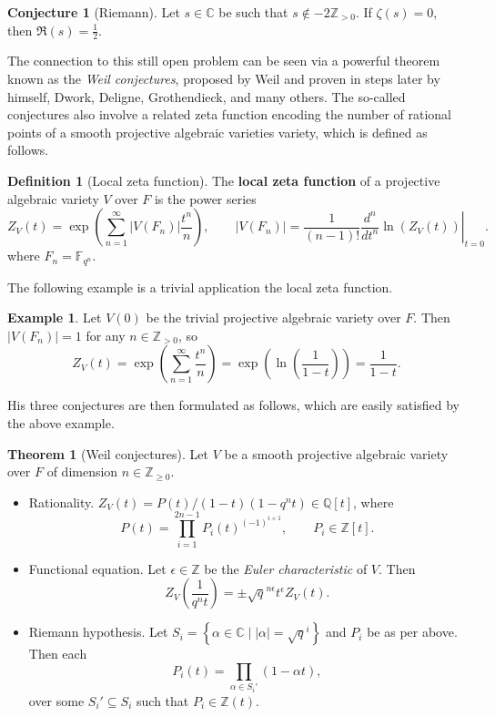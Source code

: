 \documentclass{article}
\newcommand{\F}{\mathbb{F}}
\newcommand{\Z}{\mathbb{Z}}
\newcommand{\Q}{\mathbb{Q}}
\newcommand{\C}{\mathbb{C}}
\newcommand{\val}[1]{\left. #1 \right\rvert}
\newcommand{\rb}[1]{\left( #1 \right)}
\renewcommand{\sb}[1]{\left[ #1 \right]}
\newcommand{\cb}[1]{\left\{ #1 \right\}}
\newcommand{\abs}[1]{\left\lvert #1 \right\rvert}
\theoremstyle{definition}\newtheorem*{definition}{Definition}
\theoremstyle{definition}\newtheorem*{example}{Example}
\theoremstyle{definition}\newtheorem*{remark}{Remark}
\newtheorem{theorem}[proposition]{Theorem}
\newtheorem{conjecture}[proposition]{Conjecture}
\begin{document}
\begin{conjecture}[Riemann]
Let $ s \in \C $ be such that $ s \notin -2\Z_{> 0} $. If $ \zeta\rb{s} = 0 $, then $ \Re\rb{s} = \tfrac{1}{2} $.
\end{conjecture}

The connection to this still open problem can be seen via a powerful theorem known as the \emph{Weil conjectures}, proposed by Weil and proven in steps later by himself, Dwork, Deligne, Grothendieck, and many others. The so-called conjectures also involve a related zeta function encoding the number of rational points of a smooth projective algebraic varieties variety, which is defined as follows.

\begin{definition}[Local zeta function]
The \textbf{local zeta function} of a projective algebraic variety $ V $ over $ F $ is the power series
$$ Z_V\rb{t} = \exp\rb{\sum_{n = 1}^\infty \abs{V\rb{F_n}}\dfrac{t^n}{n}}, \qquad \abs{V\rb{F_n}} = \dfrac{1}{\rb{n - 1}!}\val{\dfrac{d^n}{dt^n}\ln\rb{Z_V\rb{t}}}_{t = 0}. $$
where $ F_n = \F_{q^n} $.
\end{definition}

The following example is a trivial application the local zeta function.

\begin{example}
Let $ V\rb{0} $ be the trivial projective algebraic variety over $ F $. Then $ \abs{V\rb{F_n}} = 1 $ for any $ n \in \Z_{> 0} $, so
$$ Z_V\rb{t} = \exp\rb{\sum_{n = 1}^\infty \dfrac{t^n}{n}} = \exp\rb{\ln\rb{\dfrac{1}{1 - t}}} = \dfrac{1}{1 - t}. $$
\end{example}

His three conjectures are then formulated as follows, which are easily satisfied by the above example.

\begin{theorem}[Weil conjectures]
\label{thm:weil}
Let $ V $ be a smooth projective algebraic variety over $ F $ of dimension $ n \in \Z_{\ge 0} $.
\begin{itemize}
\item Rationality. $ Z_V\rb{t} = P\rb{t} / \rb{1 - t}\rb{1 - q^nt} \in \Q\sb{t} $, where
$$ P\rb{t} = \prod_{i = 1}^{2n - 1} P_i\rb{t}^{\rb{-1}^{i + 1}}, \qquad P_i \in \Z\sb{t}. $$
\item Functional equation. Let $ \epsilon \in \Z $ be the \emph{Euler characteristic} of $ V $. Then
$$ Z_V\rb{\dfrac{1}{q^nt}} = \pm \sqrt{q}^{n\epsilon} t^\epsilon Z_V\rb{t}. $$
\item Riemann hypothesis. Let $ S_i = \cb{\alpha \in \C \mid \abs{\alpha} = \sqrt{q}^i} $ and $ P_i $ be as per above. Then each
$$ P_i\rb{t} = \prod_{\alpha \in S_i'} \rb{1 - \alpha t}, $$
over some $ S_i' \subseteq S_i $ such that $ P_i \in \Z\rb{t} $.
\end{itemize}
\end{theorem}
\end{document}
